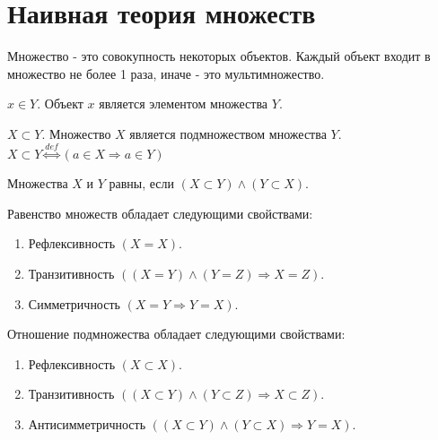 \section{Наивная теория множеств}

\begin{definition}
	Множество - это совокупность некоторых объектов. Каждый объект входит в множество не более 1 раза, иначе - это мультимножество.
\end{definition}

\begin{definition}
	$x \in Y$. Объект $x$ является элементом множества $Y$.
\end{definition}

\begin{definition}
	$X \subset Y$. Множество $X$ является подмножеством множества $Y$. $X \subset Y \stackrel{def}{\Leftrightarrow} (a \in X \Rightarrow a \in Y)$
\end{definition}

\begin{definition}
	Множества $X$ и $Y$ равны, если $(X \subset Y) \land (Y \subset X)$.
\end{definition}

\begin{proposition}
	Равенство множеств обладает следующими свойствами:
	\begin{enumerate}
		\item Рефлексивность $(X = X)$.
		\item Транзитивность $((X = Y) \land (Y = Z) \Rightarrow X = Z)$.
		\item Симметричность $(X = Y \Rightarrow Y = X)$.
	\end{enumerate}
\end{proposition}

\begin{proposition}
	Отношение подмножества обладает следующими свойствами:
	\begin{enumerate}
		\item Рефлексивность $(X \subset X)$.
		\item Транзитивность $((X \subset Y) \land (Y \subset Z) \Rightarrow X \subset Z)$.
		\item Антисимметричность $((X \subset Y) \land (Y \subset X) \Rightarrow Y = X)$.
	\end{enumerate}
\end{proposition}

